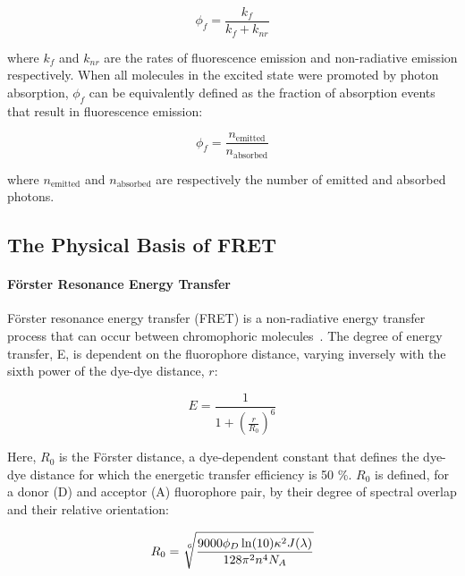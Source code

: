 \begin{equation}
\phi_f = \frac{k_f}{k_f + k_{nr}}
\label{eq:quantum_yield}
\end{equation}

where $k_f$ and $k_{nr}$ are the rates of fluorescence emission and non-radiative emission respectively. When all molecules in the excited state were promoted by photon absorption, $\phi_f$ can be equivalently defined as the fraction of absorption events that result in fluorescence emission: 


\begin{equation}
\phi_f = \frac{n_{\text{emitted}}}{n_{\text{absorbed}}}
\label{eq:quantum_yield_ratio}
\end{equation}

where $n_{\text{emitted}}$ and $n_{\text{absorbed}}$ are respectively the number of emitted and absorbed photons.


\subsection{The Physical Basis of FRET}
\label{sect:fret}
\paragraph{F\"{o}rster Resonance Energy Transfer}
F\"{o}rster resonance energy transfer (FRET) is a non-radiative energy transfer process that can occur between chromophoric molecules~\cite{forster48}. The degree of energy transfer, E, is dependent on the fluorophore distance, varying inversely with the sixth power of the dye-dye distance, $r$: 

\begin{equation}
E = \frac{1}{1+ (\frac{r}{R_0})^6}
\label{eq:FRET_d}
\end{equation}

Here, $R_0$ is the F\"{o}rster distance, a dye-dependent constant that defines the dye-dye distance for which the energetic transfer efficiency is 50 \%. $R_0$ is defined, for a donor (D) and acceptor (A) fluorophore pair, by their degree of spectral overlap and their relative orientation:

\begin{equation}
R_0 = \sqrt[\leftroot{-2}\uproot{2}6]{\frac{9000\phi_D\ln(10)\kappa^2J(\lambda)}{128\pi^2n^4N_A}}
\label{eq:R_0}
\end{equation}

